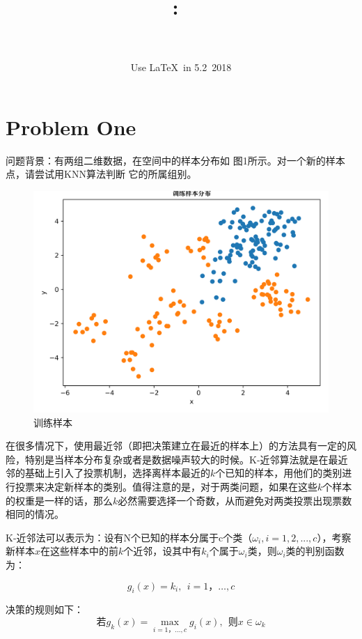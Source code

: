 \documentclass{article}
\title{
    \vspace{2in}
    \textmd{\textbf{\hmwkClass:\ \hmwkTitle}}\\
    \vspace{0.5cm}\LARGE{\textit{\hmwkClassInstructor}}
    \vspace{4in}
}
\author{\hmwkAuthorName\\
{\schoolID}\\
Use \LaTeX ~in 5.2~2018}
\date{}
\newcommand{\hs}{\hspace{2em}}
\begin{document}
\maketitle
\setcounter{page}{0}
\thispagestyle{empty}
\pagebreak

\section{Problem One}
{}

\hs 问题背景：有两组二维数据，在空间中的样本分布如 图1所示。对一个新的样本点，请尝试用KNN算法判断 它的所属组别。

\begin{figure}[htbp]
	\centering
	\includegraphics[width=0.6\linewidth]{img//fig1.png}
	\caption{训练样本}
\end{figure}

{}

\hs 在很多情况下，使用最近邻（即把决策建立在最近的样本上）的方法具有一定的风险，特别是当样本分布复杂或者是数据噪声较大的时候。K-近邻算法就是在最近邻的基础上引入了投票机制，选择离样本最近的$k$个已知的样本，用他们的类别进行投票来决定新样本的类别。值得注意的是，对于两类问题，如果在这些$k$个样本的权重是一样的话，那么$k$必然需要选择一个奇数，从而避免对两类投票出现票数相同的情况。

\hs K-近邻法可以表示为：设有N个已知的样本分属于c个类（$\omega_i,i=1,2,...,c$），考察新样本$ x$在这些样本中的前$k$个近邻，设其中有$k_i$个属于$\omega_i$类，则$\omega_i$类的判别函数为：

\begin{equation*}
g_i(x)=k_i, ~~i=1，\dots,c
\end{equation*}

\hs 决策的规则如下：
\begin{equation*}
\text{若}g_k(x)=\max_{i=1，\dots,c}g_i(x),~~\text{则}x\in \omega_k
\end{equation*}\\
\end{document}
